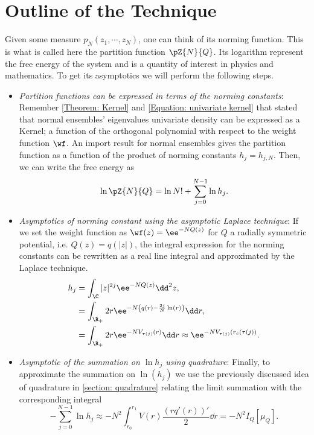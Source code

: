 \section{Outline of the Technique}
\label{Section: outline asymptotic}

Given some measure $p_N (z_1, \cdots, z_N)$, one can think of its norming function. This is what is called here the partition function $\pZ{N}{Q}$. Its logarithm represent the free energy of the system and is a quantity of interest in physics and mathematics. To get its asymptotics we will perform the following steps.

\begin{itemize}
	\item \textit{Partition functions can be expressed in terms of the norming constants}:  Remember \autoref{Theorem: Kernel} and \eqref{Equation: univariate kernel} that stated that normal ensembles' eigenvalues univariate density can be expressed as a Kernel; a function of the orthogonal polynomial with respect to the weight function $\wf$. An import result for normal ensembles gives the partition function as a function of the product of norming constants $h_j = h_{j,N}$. Then, we can write the free energy as
	\begin{equation}
			\ln \pZ{N}{Q} = \ln{N!} + \sum_{j=0}^{N-1} \ln{h_j}.
	\end{equation}
	\item \textit{Asymptotics of norming constant using the asymptotic Laplace technique}: If we set the weight function as $\wf(z) = \ee^{-NQ(z)}$ for $Q$ a radially symmetric potential, i.e. $Q(z) = q(|z|)$, the integral expression for the norming constants can be rewritten as a real line integral and approximated by the Laplace technique.
	\begin{align}
			h_j 
			& = \int_{\C} |z|^{2j} \ee^{-N Q(z)} \dd^2 z, \\
			& =  \int_{\R_+} 2 r \ee^{-N \left( q(r) - \frac{2j}{N} \ln(r) \right)} \dd r, \\
			&= \int_{\R_+} 2r \ee^{-N V_{\tau(j)}(r)} \dd r \approx \ee^{-N V_{\tau(j)}(r_c(\tau(j))}.
	\end{align}
	\item \textit{Asymptotic of the summation on $\ln h_j$ using quadrature}: Finally, to approximate the summation on $\ln(h_j)$ we use the previously discussed idea of quadrature in \autoref{section: quadrature} relating the limit summation with the corresponding integral
	\begin{equation}
		- \sum_{j=0}^{N-1} \ln{h_j} \approx - N^2 \int_{r_0}^{r_1} V(r) \frac{(r q'(r))'}{2} \dd r = - N^2 I_Q[\mu_Q].
	\end{equation}
\end{itemize}

